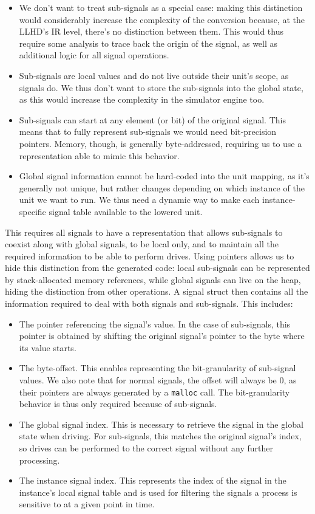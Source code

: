 \begin{itemize}
    \item We don't want to treat sub-signals as a special case: making this distinction would considerably increase the complexity of the conversion because, at the LLHD's IR level, there's no distinction between them. This would thus require some analysis to trace back the origin of the signal, as well as additional logic for all signal operations.
    \item Sub-signals are local values and do not live outside their unit's scope, as signals do. We thus don't want to store the sub-signals into the global state, as this would increase the complexity in the simulator engine too.
    \item Sub-signals can start at any element (or bit) of the original signal. This means that to fully represent sub-signals we would need bit-precision pointers. Memory, though, is generally byte-addressed, requiring us to use a representation able to mimic this behavior.
    \item Global signal information cannot be hard-coded into the unit mapping, as it’s generally not unique, but rather changes depending on which instance of the unit we want to run. We thus need a dynamic way to make each instance-speciﬁc signal table available to the lowered unit.
\end{itemize}

This requires all signals to have a representation that allows sub-signals to coexist along with global signals, to be local only, and to maintain all the required information to be able to perform drives. Using pointers allows us to hide this distinction from the generated code: local sub-signals can be represented by stack-allocated memory references, while global signals can live on the heap, hiding the distinction from other operations. A signal struct then contains all the information required to deal with both signals and sub-signals. This includes:

\begin{itemize}
    \item The pointer referencing the signal's value. In the case of sub-signals, this pointer is obtained by shifting the original signal's pointer to the byte where its value starts.
    \item The byte-offset. This enables representing the bit-granularity of sub-signal values. We also note that for normal signals, the offset will always be $0$, as their pointers are always generated by a \texttt{malloc} call. The bit-granularity behavior is thus only required because of sub-signals.
    \item The global signal index. This is necessary to retrieve the signal in the global state when driving. For sub-signals, this matches the original signal's index, so drives can be performed to the correct signal without any further processing.
    \item The instance signal index. This represents the index of the signal in the instance's local signal table and is used for filtering the signals a process is sensitive to at a given point in time.
\end{itemize}

